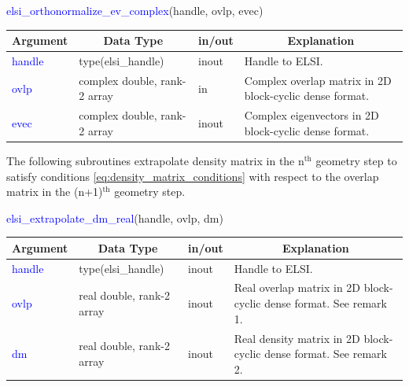 \documentclass{report}
\begin{document}
\begin{labeling}{\hspace{6cm}}
\item [\hspace{0.3cm} \textcolor{blue}{elsi\_orthonormalize\_ev\_complex}(handle, ovlp, evec)]
\end{labeling}

\begin{tabular}[]{|p{20mm}|p{45mm}|p{15mm}|p{85mm}|}
\hline
\multicolumn{1}{|c|}{\textbf{Argument}} & \multicolumn{1}{c|}{\textbf{Data Type}} & \multicolumn{1}{c|}{\textbf{in/out}} & \multicolumn{1}{c|}{\textbf{Explanation}}\\
\hline
\textcolor{blue}{handle} & type(elsi\_handle)           & inout & Handle to ELSI.\\
\hline
\textcolor{blue}{ovlp}   & complex double, rank-2 array & in    & Complex overlap matrix in 2D block-cyclic dense format.\\
\hline
\textcolor{blue}{evec}   & complex double, rank-2 array & inout & Complex eigenvectors in 2D block-cyclic dense format.\\
\hline
\end{tabular}

The following subroutines extrapolate density matrix in the n$^\text{th}$ geometry step to satisfy conditions \ref{eq:density_matrix_conditions} with respect to the overlap matrix in the (n+1)$^\text{th}$ geometry step.
\begin{labeling}{\hspace{6cm}}
\item [\hspace{0.3cm} \textcolor{blue}{elsi\_extrapolate\_dm\_real}(handle, ovlp, dm)]
\end{labeling}

\begin{tabular}[]{|p{20mm}|p{45mm}|p{15mm}|p{85mm}|}
\hline
\multicolumn{1}{|c|}{\textbf{Argument}} & \multicolumn{1}{c|}{\textbf{Data Type}} & \multicolumn{1}{c|}{\textbf{in/out}} & \multicolumn{1}{c|}{\textbf{Explanation}}\\
\hline
\textcolor{blue}{handle} & type(elsi\_handle)        & inout & Handle to ELSI.\\
\hline
\textcolor{blue}{ovlp}   & real double, rank-2 array & inout & Real overlap matrix in 2D block-cyclic dense format.  See remark 1.\\
\hline
\textcolor{blue}{dm}     & real double, rank-2 array & inout & Real density matrix in 2D block-cyclic dense format.  See remark 2.\\
\hline
\end{tabular}
\end{document}
